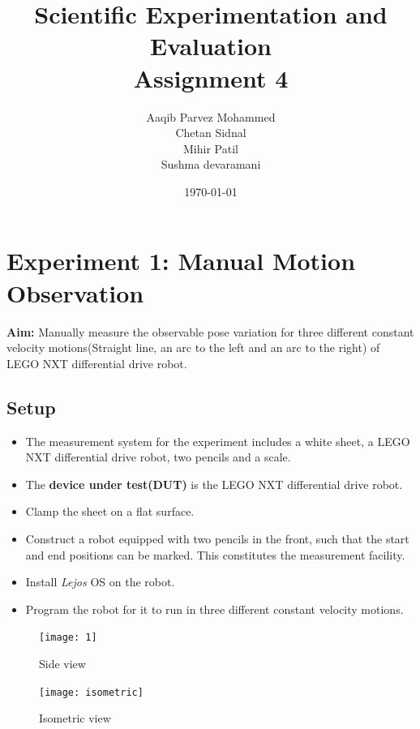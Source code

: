 \documentclass[11pt,a4paper]{article}
\begin{document}
	\title{\textbf{Scientific Experimentation and Evaluation \\ Assignment 4}}
	\author{Aaqib Parvez Mohammed \\ Chetan Sidnal\\ Mihir Patil \\ Sushma devaramani}
	\date{\today}
	\maketitle
	\newpage
	\tableofcontents
	\newpage
	\listoffigures
	\newpage
	\listoftables
	\newpage
	\section{Experiment 1: Manual Motion Observation}
	\textbf{Aim:} Manually measure the observable pose variation for three different constant velocity motions(Straight line, an arc to the left and an arc to the right) of LEGO NXT differential drive robot.
	
	\subsection{\textbf{Setup}}
	\begin{itemize}
		\item The measurement system for the experiment includes a white sheet, a LEGO NXT differential drive robot, two pencils and a scale.
		\item The \textbf{device under test(DUT)} is the LEGO NXT differential drive robot.
		\item Clamp the sheet on a flat surface.
		\item Construct a robot equipped with two pencils in the front, such that the start and end positions can be marked. This constitutes the measurement facility.
		\item Install \textit{Lejos} OS on the robot.
		\item Program the robot for it to run in three different constant velocity motions.
	\end{itemize}
	
	\begin{figure}[H]
		\centering
		\centering
		\texttt{[image: 1]}
		\caption{Side view}
		\label{fig:side}
	\end{figure}
	
	\begin{figure}[H]
		\centering
		\centering
		\texttt{[image: isometric]}
		\caption{Isometric view}
		\label{fig:iso}
	\end{figure}
	
\end{document}

